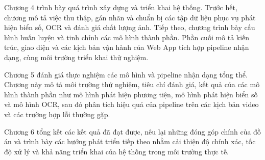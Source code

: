 \documentclass[../DoAn.tex]{subfiles}
\begin{document}
Chương 4 trình bày quá trình xây dựng và triển khai hệ thống. Trước hết, chương mô tả việc thu thập, gán nhãn và chuẩn bị các tập dữ liệu phục vụ phát hiện biển số, OCR và đánh giá chất lượng ảnh. Tiếp theo, chương trình bày cấu hình huấn luyện và tinh chỉnh các mô hình thành phần. Phần cuối mô tả kiến trúc, giao diện và các kịch bản vận hành của Web App tích hợp pipeline nhận dạng, cùng môi trường triển khai thử nghiệm.

Chương 5 đánh giá thực nghiệm các mô hình và pipeline nhận dạng tổng thể. Chương này mô tả môi trường thử nghiệm, tiêu chí đánh giá, kết quả của các mô hình thành phần như mô hình phát hiện phương tiện, mô hình phát hiện biển số và mô hình OCR, sau đó phân tích hiệu quả của pipeline trên các kịch bản video và các trường hợp lỗi thường gặp.

Chương 6 tổng kết các kết quả đã đạt được, nêu lại những đóng góp chính của đồ án và trình bày các hướng phát triển tiếp theo nhằm cải thiện độ chính xác, tốc độ xử lý và khả năng triển khai của hệ thống trong môi trường thực tế.
\end{document}
